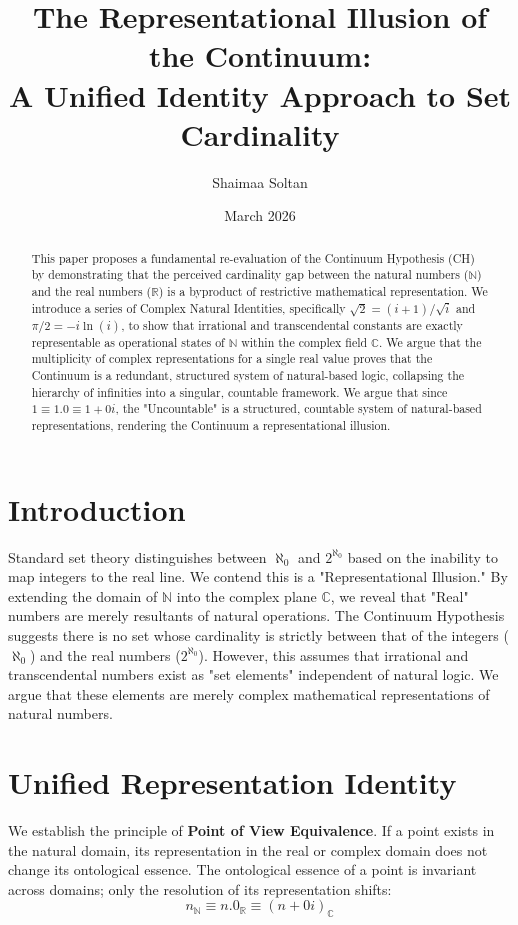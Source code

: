 \documentclass[12pt,a4paper]{article}
\title{The Representational Illusion of the Continuum: \\ A Unified Identity Approach to Set Cardinality}
\author{Shaimaa Soltan}
\date{March 2026}
\begin{document}
\maketitle

\begin{abstract}
This paper proposes a fundamental re-evaluation of the Continuum Hypothesis (CH) by demonstrating that the perceived cardinality gap between the natural numbers ($\mathbb{N}$) and the real numbers ($\mathbb{R}$) is a byproduct of restrictive mathematical representation. We introduce a series of Complex Natural Identities, specifically $\sqrt{2} = (i+1)/\sqrt{i}$ and $\pi/2 = -i \ln(i)$, to show that irrational and transcendental constants are exactly representable as operational states of $\mathbb{N}$ within the complex field $\mathbb{C}$. We argue that the multiplicity of complex representations for a single real value proves that the Continuum is a redundant, structured system of natural-based logic, collapsing the hierarchy of infinities into a singular, countable framework. We argue that since $1 \equiv 1.0 \equiv 1+0i$, the "Uncountable" is a structured, countable system of natural-based representations, rendering the Continuum a representational illusion.
\end{abstract}

\section{Introduction}
Standard set theory distinguishes between $\aleph_0$ and $2^{\aleph_0}$ based on the inability to map integers to the real line. We contend this is a "Representational Illusion." By extending the domain of $\mathbb{N}$ into the complex plane $\mathbb{C}$, we reveal that "Real" numbers are merely resultants of natural operations.
The Continuum Hypothesis suggests there is no set whose cardinality is strictly between that of the integers ($\aleph_0$) and the real numbers ($2^{\aleph_0}$). However, this assumes that irrational and transcendental numbers exist as "set elements" independent of natural logic. We argue that these elements are merely complex mathematical representations of natural numbers.

\section{Unified Representation Identity}
We establish the principle of \textbf{Point of View Equivalence}. If a point exists in the natural domain, its representation in the real or complex domain does not change its ontological essence. The ontological essence of a point is invariant across domains; only the resolution of its representation shifts:
\begin{equation}
    n_{\mathbb{N}} \equiv n.0_{\mathbb{R}} \equiv (n + 0i)_{\mathbb{C}}
\end{equation}
\end{document}
